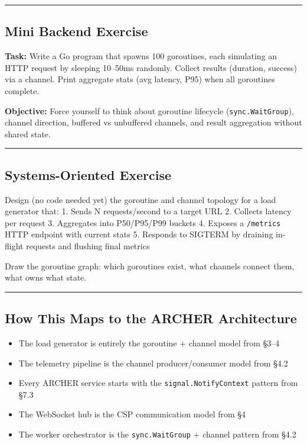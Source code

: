 \documentclass[
]{article}
\providecommand{\tightlist}{%
  \setlength{\itemsep}{0pt}\setlength{\parskip}{0pt}}
\begin{document}
\begin{center}\rule{0.5\linewidth}{0.5pt}\end{center}

\hypertarget{mini-backend-exercise}{%
\subsection{Mini Backend Exercise}\label{mini-backend-exercise}}

\textbf{Task:} Write a Go program that spawns 100 goroutines, each
simulating an HTTP request by sleeping 10--50ms randomly. Collect
results (duration, success) via a channel. Print aggregate stats (avg
latency, P95) when all goroutines complete.

\textbf{Objective:} Force yourself to think about goroutine lifecycle
(\texttt{sync.WaitGroup}), channel direction, buffered vs unbuffered
channels, and result aggregation without shared state.

\begin{center}\rule{0.5\linewidth}{0.5pt}\end{center}

\hypertarget{systems-oriented-exercise}{%
\subsection{Systems-Oriented Exercise}\label{systems-oriented-exercise}}

Design (no code needed yet) the goroutine and channel topology for a
load generator that: 1. Sends N requests/second to a target URL 2.
Collects latency per request 3. Aggregates into P50/P95/P99 buckets 4.
Exposes a \texttt{/metrics} HTTP endpoint with current stats 5. Responds
to SIGTERM by draining in-flight requests and flushing final metrics

Draw the goroutine graph: which goroutines exist, what channels connect
them, what owns what state.

\begin{center}\rule{0.5\linewidth}{0.5pt}\end{center}

\hypertarget{how-this-maps-to-the-archer-architecture}{%
\subsection{How This Maps to the ARCHER
Architecture}\label{how-this-maps-to-the-archer-architecture}}

\begin{itemize}
\tightlist
\item
  The load generator is entirely the goroutine + channel model from
  §3--4
\item
  The telemetry pipeline is the channel producer/consumer model from
  §4.2
\item
  Every ARCHER service starts with the \texttt{signal.NotifyContext}
  pattern from §7.3
\item
  The WebSocket hub is the CSP communication model from §4
\item
  The worker orchestrator is the \texttt{sync.WaitGroup} + channel
  pattern from §4.2
\end{itemize}
\end{document}
